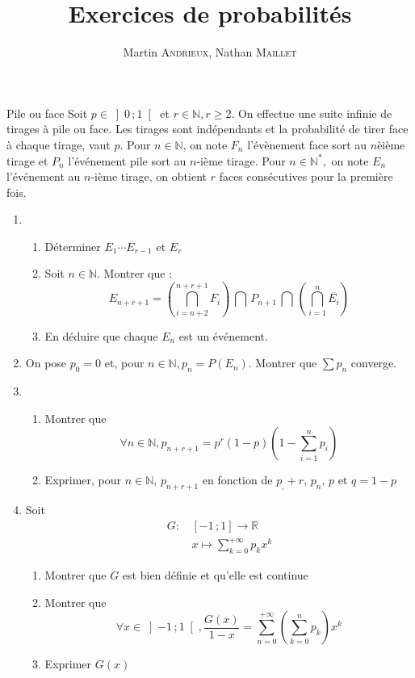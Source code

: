 \documentclass[french, a4paper, 11pt]{article}
\title{Exercices de probabilités}
\author{Martin \textsc{Andrieux}, Nathan \textsc{Maillet}}
\date{}
\newcommand{\N}{\mathbb{N}}   %
\newcommand{\R}{\mathbb{R}}   %
\newcommand{\interoo}[2]{\left]#1\,;#2\right[}   %
\newcommand{\interff}[2]{\left[#1\,;#2\right]}   %
\begin{document}
\maketitle

\begin{cadre}{Pile ou face}
  Soit \(p \in \interoo{0}{1}\) et \(r \in \N, r\geq 2\). On effectue une suite infinie de tirages à pile ou face.
  Les tirages sont indépendants et la probabilité de tirer face à chaque tirage, vaut \(p\). Pour
  \(n\in \N\), on note \(F_n\) l'évènement \og
  face sort au \(n\)èième tirage \fg{} et \(P_n\) l'événement \og pile sort au \(n\)-ième
  tirage\fg{}. Pour \(n \in \N^*,\) on note \(E_n\) l'événement \og au \(n\)-ième tirage, on obtient \(r\) faces consécutives
  pour la première fois\fg{}.
  \begin{enumerate}
    \item
      \begin{enumerate}
        \item Déterminer \(E_1 \cdots E_{r-1}\) et \(E_r\)
        \item Soit \(n \in \N\). Montrer que :
                \[E_{n+r+1}=\left(\bigcap_{i=n+2}^{n+r+1}F_i\right)\,\bigcap\, P_{n+1}\,\bigcap\, \left(\bigcap_{i=1}^{n}\overline{E_i}\right)\]
        \item En déduire que chaque \(E_n\) est un événement.
      \end{enumerate}
    \item On pose \(p_0=0\) et, pour \(n\in \N, p_n=P(E_n)\).
        Montrer que \(\sum p_n\) converge.
    \item 
      \begin{enumerate}
        \item Montrer que \[\forall n \in \N, p_{n+r+1}=p^r(1-p)\left(1-\sum_{i=1}^{n}p_i\right)\]
        \item Exprimer, pour \(n \in \N\), \(p_{n+r+1}\) en fonction de \(p_,+r\), \(p_n\), \(p\) et \(q=1-p\)
      \end{enumerate}
    \item Soit \begin{align*}
                    G :\, & \interff{-1}{1} \rightarrow \R \\
                          & x \mapsto \sum_{k=0}^{+\infty}p_k x^k
                \end{align*}
          \begin{enumerate}
            \item Montrer que \(G\) est bien définie et qu'elle est continue
            \item Montrer que 
                  \[\forall x \in \interoo{-1}{1}, \frac{G(x)}{1-x}=\sum_{n=0}^{+\infty}\left(\sum_{k=0}^{n} p_k\right) x^k\]
            \item Exprimer \(G(x)\)
          \end{enumerate}
  \end{enumerate}
\end{cadre}
\end{document}
